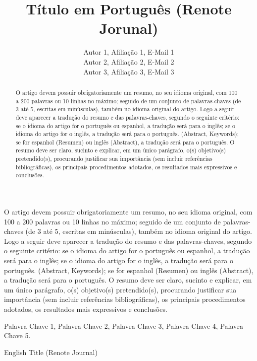 \documentclass[a4paper]{article}
\title{Título em Português (Renote Jorunal)}
\author{
    Autor 1, Afiliação 1, E-Mail 1 \\ 
    Autor 2, Afiliação 2, E-Mail 2 \\
    Autor 3, Afiliação 3, E-Mail 3
}
\begin{document}
 

\maketitle

\begin{resumo} 
O artigo devem possuir obrigatoriamente um resumo, no seu idioma original, com 100 a 200 palavras ou 10 linhas no máximo; seguido de um conjunto de palavras-chaves (de 3 até 5, escritas em minúsculas), também no idioma original do artigo. Logo a seguir deve aparecer a tradução do resumo e das palavras-chaves, segundo o seguinte critério: se o idioma do artigo for o português ou espanhol, a tradução será para o inglês; se o idioma do artigo for o inglês, a tradução será para o português. (Abstract, Keywords); se for espanhol (Resumen) ou inglês (Abstract), a tradução será para o português. O resumo deve ser claro, sucinto e explicar, em um único parágrafo, o(s) objetivo(s) pretendido(s), procurando justificar sua importância (sem incluir referências bibliográficas), os principais procedimentos adotados, os resultados mais expressivos e conclusões.
\end{resumo}

\begin{palavas-chave}
    Palavra Chave 1, Palavra Chave 2, Palavra Chave 3, Palavra Chave 4, Palavra Chave 5.
\end{palavas-chave}

\begin{englishtitle}
    English Title (Renote Journal)
\end{englishtitle}

\begin{abstract}
O artigo devem possuir obrigatoriamente um resumo, no seu idioma original, com 100 a 200 palavras ou 10 linhas no máximo; seguido de um conjunto de palavras-chaves (de 3 até 5, escritas em minúsculas), também no idioma original do artigo. Logo a seguir deve aparecer a tradução do resumo e das palavras-chaves, segundo o seguinte critério: se o idioma do artigo for o português ou espanhol, a tradução será para o inglês; se o idioma do artigo for o inglês, a tradução será para o português. (Abstract, Keywords); se for espanhol (Resumen) ou inglês (Abstract), a tradução será para o português. O resumo deve ser claro, sucinto e explicar, em um único parágrafo, o(s) objetivo(s) pretendido(s), procurando justificar sua importância (sem incluir referências bibliográficas), os principais procedimentos adotados, os resultados mais expressivos e conclusões.
\end{abstract}
\end{document}

